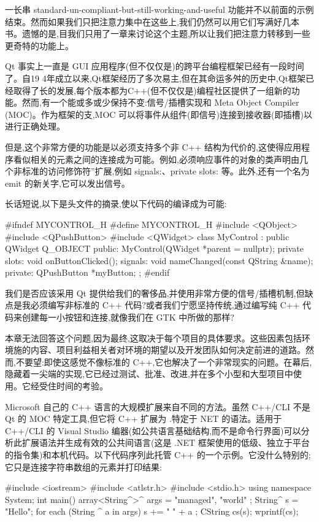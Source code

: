 一长串 standard-un-compliant-but-still-working-and-useful 功能并不以前面的示例结束。然而如果我们只把注意力集中在这些上,我们仍然可以用它们写满好几本书。遗憾的是,目我们只用了一章来讨论这个主题,所以让我们把注意力转移到一些更奇特的功能上。

Qt 事实上一直是 GUI 应用程序(但不仅仅是)的跨平台编程框架已经有一段时间了。自19 4年成立以来,Qt框架经历了多次易主,但在其命运多舛的历史中,Qt框架已经取得了长的发展,每个版本都为C++(但不仅仅是)编程社区提供了一组新的功能。然而,有一个能或多或少保持不变:信号/插槽实现和 Meta Object Compiler (MOC)。作为框架的支,MOC 可以将事件从组件(即信号)连接到接收器(即插槽)以进行正确处理。

但是,这个非常方便的功能是以必须支持多个非 C++ 结构为代价的,这使得应用程序看似相关的元素之间的连接成为可能。例如,必须响应事件的对象的类声明由几个非标准的访问修饰符”扩展,例如 signals:、private slots: 等。此外,还有一个名为 emit 的新关字,它可以发出信号。

长话短说,以下是头文件的摘录,使以下代码的编译成为可能:

\begin{cpp}
#ifndef MYCONTROL_H
#define MYCONTROL_H
#include <QObject>
#include <QPushButton>
#include <QWidget>
class MyControl : public QWidget {
  Q_OBJECT
public:
  MyControl(QWidget *parent = nullptr);
private slots:
  void onButtonClicked();
signals:
  void nameChanged(const QString &name);
private:
  QPushButton *myButton;
};
#endif
\end{cpp}

我们是否应该采用 Qt 提供给我们的奢侈品,并使用非常方便的信号/插槽机制,但缺点是我必须编写非标准的 C++ 代码?或者我们宁愿坚持传统,通过编写纯 C++ 代码来创建每一小按钮和连接,就像我们在 GTK 中所做的那样? 

本章无法回答这个问题,因为最终,这取决于每个项目的具体要求。这些因素包括环境施的内容、项目利益相关者对环境的期望以及开发团队如何决定前进的道路。然而,不要望:即使这感觉不像标准的 C++,它也解决了一个非常现实的问题。在幕后,隐藏着一尖端的实现,它已经过测试、批准、改进,并在多个小型和大型项目中使用。它经受住时间的考验。

Microsoft 自己的 C++ 语言的大规模扩展来自不同的方法。虽然 C++/CLI 不是 Qt 的 MOC 特定工具,但它将 C++ 扩展为 .特定于 NET 的语法。适用于 C++/CLI 的 Visual Studio 编器(如公共语言基础结构,而不是命令行界面)可以分析此扩展语法并生成有效的公共间语言(这是 .NET 框架使用的低级、独立于平台的指令集)和本机代码。以下代码序列此托管 C++ 的一个示例。它没什么特别的;它只是连接字符串数组的元素并打印结果:

\begin{cpp}
#include <iostream>
#include <atlstr.h>
#include <stdio.h>
using namespace System;
int main() {
  array<String^>^ args = { "managed", "world" };
  String^ s = "Hello";
  for each (String ^ a in args) s += " " + a ;
  CString cs(s);
  wprintf(cs);
}
\end{cpp}

